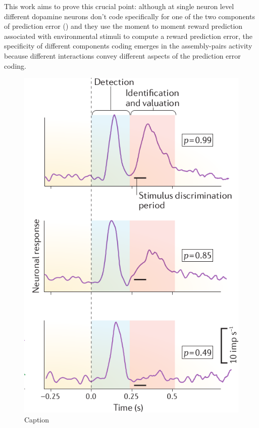 This work aims to prove this crucial point: although at single neuron level different dopamine neurons don't code specifically for one of the two components of prediction error (\cite{UchidaDop}) and they use the moment to moment reward prediction associated with environmental stimuli to compute a reward prediction error, the specificity of different components coding emerges in the assembly-pairs activity because different interactions convey different aspects of the prediction error coding.
\begin{figure}
    \centering
    \includegraphics[scale=0.4]{figures/ResponseProbSchultz.png}
    \caption{Caption}
    \label{fig:probSchultz}
\end{figure}%
